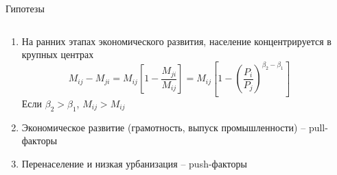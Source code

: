 \documentclass[aspectratio=169]{beamer}
\begin{document}
\begin{frame}{Гипотезы}

\begin{columns}
	\begin{column}{0.60\textwidth}
		\begin{enumerate}
			\item На ранних этапах экономического развития, население концентрируется в крупных центрах
			\begin{equation*}
                    M_{ij} - M_{ji} = M_{ij} \left[ 1 - \frac{M_{ji}}{M_{ij}} \right] = M_{ij} \left[ 1 - \left( \frac{P_i}{P_j} \right)^{\beta_2 - \beta_1} \right]
			\end{equation*}
			Если $\beta_2>\beta_1$, $M_{ij}>M_{ij}$ \citep{poot_gravity_2016}
			\item Экономическое развитие (грамотность, выпуск промышленности) -- pull-факторы
			\item Перенаселение и низкая урбанизация -- push-факторы
		\end{enumerate}
	\end{column}
	
	\begin{column}{0.34\textwidth}
		
	\end{column}
\end{columns}

\end{frame}


\end{document}
